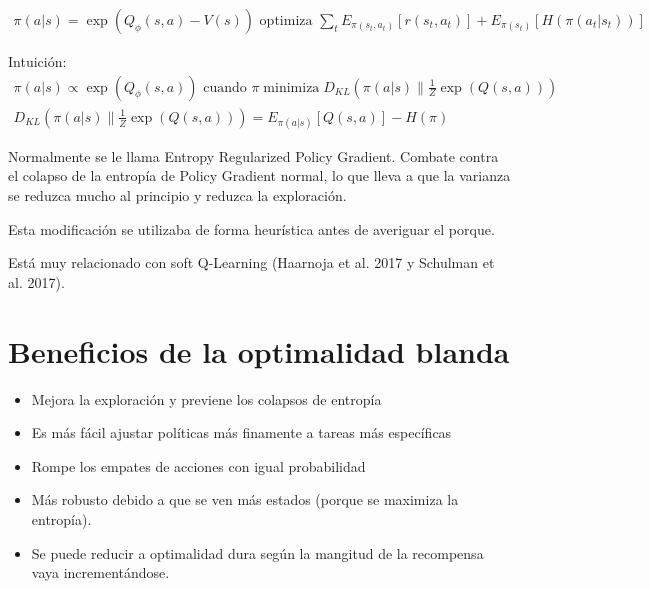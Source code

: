 \begin{align}
\pi ( a | s ) = \operatorname { exp } ( Q _ { \phi } ( s , a ) - V ( s ) ) \text { optimiza } \sum _ { t } E _ { \pi ( s _ { t } , a _ { t } ) } [ r ( s _ { t } , a _ { t } ) ] + E _ { \pi ( s _ { t } ) } [ H ( \pi ( a _ { t } | s _ { t } ) ) ]
\end{align}

Intuición:
\begin{align}
\pi ( a | s ) \propto \operatorname { exp } ( Q _ { \phi } ( s , a ) ) \text { cuando } \pi
\operatorname { minimiza } D _ { KL } ( \pi ( a | s ) \| \frac { 1 } { Z } \operatorname { exp }
( Q ( s , a ) ) )\\
D _ { KL } ( \pi ( a | s ) \| \frac { 1 } { Z } \operatorname { exp } ( Q ( s , a ) ) ) = E _ { \pi ( a | s ) } [ Q ( s , a ) ] - H ( \pi )
\end{align}

Normalmente se le llama Entropy Regularized Policy Gradient. Combate contra el colapso de la
entropía de Policy Gradient normal, lo que lleva a que la varianza se reduzca mucho al
principio y reduzca la exploración.

Esta modificación se utilizaba de forma heurística antes de averiguar el porque.

Está muy relacionado con soft Q-Learning (Haarnoja et al. 2017 y Schulman et al. 2017).

\section{Beneficios de la optimalidad blanda}%
\label{sec:beneficios_de_la_optimalidad_blanda}

\begin{itemize}
    \item Mejora la exploración y previene los colapsos de entropía
    \item Es más fácil ajustar políticas más finamente a tareas más específicas
    \item Rompe los empates de acciones con igual probabilidad
    \item Más robusto debido a que se ven más estados (porque se maximiza la entropía).
    \item Se puede reducir a optimalidad dura según la mangitud de la recompensa vaya
        incrementándose.
\end{itemize}
